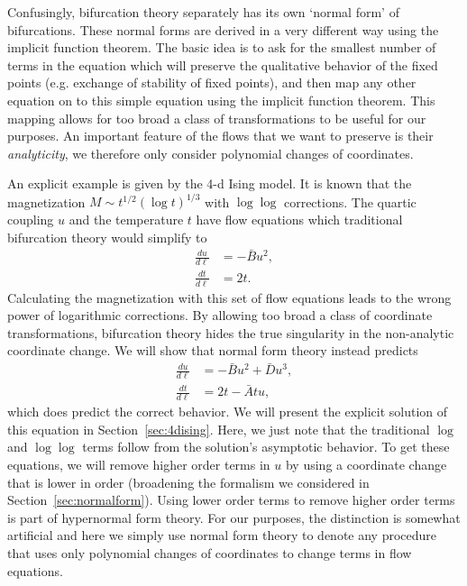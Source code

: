 \documentclass[
 reprint,
 amsmath,amssymb,
 aps, superscriptaddress, pre
]{revtex4-1}
\begin{document}
Confusingly, bifurcation theory separately has its own `normal form' of bifurcations. These normal forms are derived in a very different way using the implicit function theorem. The basic idea is to ask for the smallest number of terms in the equation which will preserve the qualitative behavior of the fixed points (e.g. exchange of stability of fixed points), and then map any other equation on to this simple equation using the implicit function theorem. This mapping allows for too broad a class of transformations to be useful for our purposes. An important feature of the flows that we want to preserve is their \textit{analyticity}, we therefore only consider polynomial changes of coordinates.

An explicit example is given by the 4-d Ising model. It is known that the magnetization $M \sim t^{1/2} (\log t)^{1/3}$ with $\log \log$ corrections. The quartic coupling $u$ and the temperature $t$ have flow equations which traditional bifurcation theory would simplify to
\begin{align}
 \frac{d u}{d \ell} &= - \bar{B} u^2 , \\
 \frac{d t}{d \ell} &= 2 t .
\end{align}
Calculating the magnetization with this set of flow equations leads to the wrong power of logarithmic corrections. By allowing too broad a class of coordinate transformations, bifurcation theory hides the true singularity in the non-analytic coordinate change. We will show that normal form theory instead predicts  
\begin{align}
 \frac{d u}{d \ell} &= -\bar{B} u^2 + \bar{D} u^3 , \\
 \frac{d t}{d \ell} &= 2 t - \bar{A} t u ,
\end{align}
which does predict the correct behavior. We will present the explicit solution of this equation in Section~\ref{sec:4dising}. Here, we just note that the traditional $\log$ and $\log \log$ terms follow from the solution's  asymptotic behavior.  To get these equations, we will remove higher order terms in $u$ by using a coordinate change that is lower in order (broadening the formalism we considered in Section~\ref{sec:normalform}). Using lower order terms to remove higher order terms is part of hypernormal form theory. For our purposes, the distinction is somewhat artificial and  here we simply use normal form theory to denote any procedure that uses only polynomial changes of coordinates to change terms in flow equations. 

\end{document}
